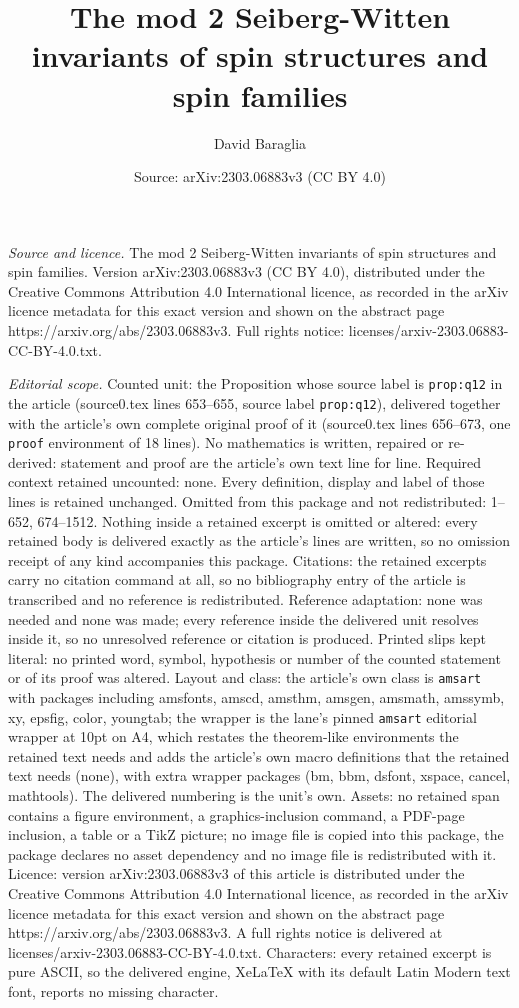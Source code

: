 \documentclass[10pt,a4paper]{amsart}
\title[The mod 2 Seiberg-Witten invariants of spin structures and s]{The mod 2 Seiberg-Witten invariants of spin structures and spin families}
\author{David Baraglia}
\date{Source: arXiv:2303.06883v3 (CC BY 4.0)}
\begin{document}
\maketitle

\noindent\emph{Source and licence.} The mod 2 Seiberg-Witten invariants of spin structures and spin families. Version arXiv:2303.06883v3 (CC BY 4.0), distributed under the Creative Commons Attribution 4.0 International licence, as recorded in the arXiv licence metadata for this exact version and shown on the abstract page https://arxiv.org/abs/2303.06883v3. Full rights notice: licenses/arxiv-2303.06883-CC-BY-4.0.txt.\par\smallskip

\noindent\textit{Editorial scope.} Counted unit: the Proposition whose source label is \texttt{prop:q12} in the article (source0.tex lines 653--655, source label \texttt{prop:q12}), delivered together with the article's own complete original proof of it (source0.tex lines 656--673, one \texttt{proof} environment of 18 lines). No mathematics is written, repaired or re-derived: statement and proof are the article's own text line for line. Required context retained uncounted: none. Every definition, display and label of those lines is retained unchanged. Omitted from this package and not redistributed: 1--652, 674--1512. Nothing inside a retained excerpt is omitted or altered: every retained body is delivered exactly as the article's lines are written, so no omission receipt of any kind accompanies this package. Citations: the retained excerpts carry no citation command at all, so no bibliography entry of the article is transcribed and no reference is redistributed. Reference adaptation: none was needed and none was made; every reference inside the delivered unit resolves inside it, so no unresolved reference or citation is produced. Printed slips kept literal: no printed word, symbol, hypothesis or number of the counted statement or of its proof was altered. Layout and class: the article's own class is \texttt{amsart} with packages including amsfonts, amscd, amsthm, amsgen, amsmath, amssymb, xy, epsfig, color, youngtab; the wrapper is the lane's pinned \texttt{amsart} editorial wrapper at 10pt on A4, which restates the theorem-like environments the retained text needs and adds the article's own macro definitions that the retained text needs (none), with extra wrapper packages (bm, bbm, dsfont, xspace, cancel, mathtools). The delivered numbering is the unit's own. Assets: no retained span contains a figure environment, a graphics-inclusion command, a PDF-page inclusion, a table or a TikZ picture; no image file is copied into this package, the package declares no asset dependency and no image file is redistributed with it. Licence: version arXiv:2303.06883v3 of this article is distributed under the Creative Commons Attribution 4.0 International licence, as recorded in the arXiv licence metadata for this exact version and shown on the abstract page https://arxiv.org/abs/2303.06883v3. A full rights notice is delivered at licenses/arxiv-2303.06883-CC-BY-4.0.txt. Characters: every retained excerpt is pure ASCII, so the delivered engine, XeLaTeX with its default Latin Modern text font, reports no missing character.
\end{document}
